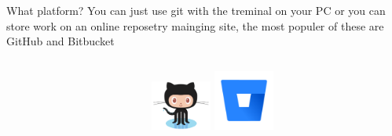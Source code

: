 \documentclass[10pt]{beamer}
\begin{document}
\begin{frame}[fragile]{What platform?}
You can just use git with the treminal on your PC or you can store work on an online reposetry mainging site, the most populer of these are GitHub and Bitbucket\\
  \begin{columns}[T]
    \begin{column}{.8\textwidth}
    \end{column}
    \begin{column}{.2\textwidth}
	\includegraphics[width=2cm]{Figs/git/Octocat} \newline  \newline   \newline 
	\includegraphics[width=2cm]{Figs/git/Bitbucket}
    \end{column}
  \end{columns}
\end{frame}
\end{document}
